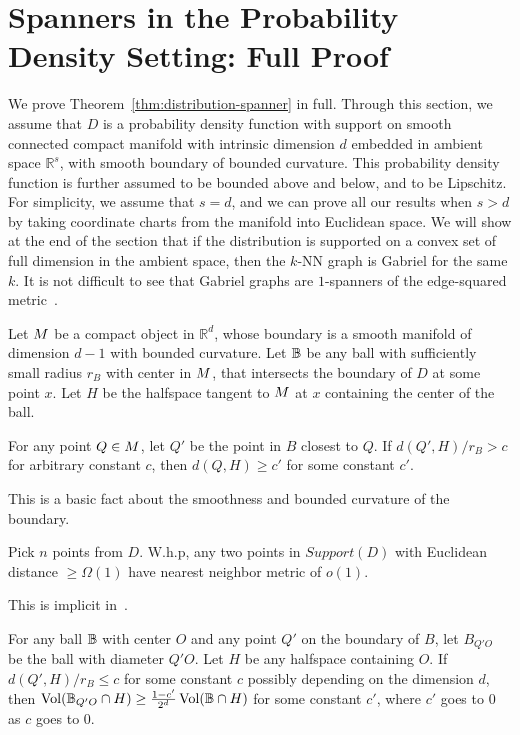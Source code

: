 \section{Spanners in the Probability Density Setting: Full
  Proof}\label{ap:distribution-spanner}

We prove Theorem~\ref{thm:distribution-spanner} in full.
Through this section, we assume that $D$ is a probability density
function with support on smooth connected compact manifold with intrinsic dimension
$d$ embedded in ambient space $\mathbb{R}^s$,
with smooth boundary of bounded curvature. This
probability density function is further assumed to be bounded
above and below, and to be Lipschitz. For simplicity, we assume that
$s=d$, and we can prove all our results when $s > d$ by taking
coordinate charts from the manifold into Euclidean space.  We
will show at the end of the section that if the distribution is
supported on a convex set of full dimension in the ambient space,
then the $k$-NN graph is Gabriel for the same $k$. It is not
difficult to see that Gabriel graphs are $1$-spanners of the
edge-squared metric~\cite{SridharMaster}.

\begin{lemma}
  Let $M$ be a compact object in $\mathbb{R}^d$, whose
  boundary is a smooth manifold of dimension $d-1$ with bounded
  curvature.
  Let $\mathbb{B}$ be any ball with sufficiently small radius
  $r_B$ with center in $M$, that intersects the boundary of $D$
  at some point $x$.
  Let $H$ be the halfspace tangent to $M$ at $x$ containing the center
  of the ball.

For any point $Q \in M$, let $Q'$ be the point in $B$
closest to $Q$. If $d(Q', H) / r_B > c$ for arbitrary constant $c$,
then $d(Q, H) \geq c'$ for some constant $c'$.
\end{lemma}

This is a basic fact about the smoothness and bounded curvature
of the boundary.

\begin{lemma} Pick $n$ points from $D$. W.h.p, any two points in
  $Support(D)$ with Euclidean distance $ \geq \Omega(1)$
  have nearest neighbor metric of $o(1)$.
\end{lemma}

This is implicit in~\cite{hwang2016}.
\begin{lemma} For any ball $\mathbb{B}$ with center $O$ and any point $Q'$ on the
  boundary of $B$, let $B_{Q'O}$ be the ball with diameter $Q'O$.
  Let $H$ be any halfspace containing $O$.
  If $d(Q', H) / r_B \leq c$ for some constant
  $c$ possibly depending on the dimension $d$, then
  $\operatorname{Vol}(\mathbb{B}_{Q'O} \cap H) \geq \frac{1-c'}{2^d} \operatorname{Vol}(\mathbb{B} \cap H)$
  for some
  constant $c'$, where $c'$ goes to $0$ as $c$ goes to $0$.
\end{lemma}


